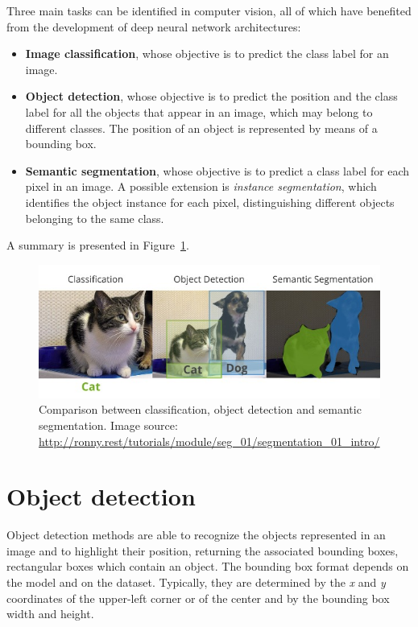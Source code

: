\documentclass[%
    corpo=12pt,
    twoside,
    stile=classica,   
    tipotesi=magistrale,
    evenboxes,
    english,
	numerazioneromana,
]{toptesi}
\begin{document}
Three main tasks can be identified in computer vision, all of which have benefited from the development of deep neural network architectures:

\begin{itemize}
	\item \textbf{Image classification}, whose objective is to predict the class label for an image.
	\item \textbf{Object detection}, whose objective is to predict the position and the class label for all the objects that appear in an image, which may belong to different classes. The position of an object is represented by means of a bounding box.
	\item \textbf{Semantic segmentation}, whose objective is to predict a class label for each pixel in an image. A possible extension is \textit{instance segmentation}, which identifies the object instance for each pixel, distinguishing different objects belonging to the same class.
\end{itemize}

A summary is presented in Figure~\ref{fig:classdetseg}.

\begin{figure}
	\centering
	\includegraphics[width=.9\textwidth]{imgs/classification_detection_segmentaion.jpeg}
	\caption[Comparison between classification, object detection and semantic segmentation]{Comparison between classification, object detection and semantic segmentation. Image source: \url{http://ronny.rest/tutorials/module/seg_01/segmentation_01_intro/}}
	\label{fig:classdetseg}
\end{figure}

\section{Object detection}\label{sec:detection}
Object detection methods are able to recognize the objects represented in an image and to highlight their position, returning the associated bounding boxes, rectangular boxes which contain an object. The bounding box format depends on the model and on the dataset. Typically, they are determined by the \textit{x} and \textit{y} coordinates of the upper-left corner
or of the center
and by the bounding box width and height.
\end{document}
